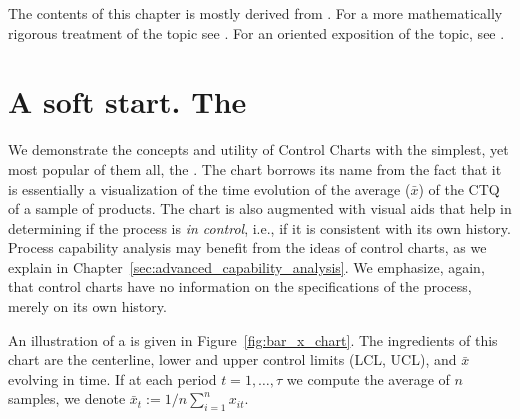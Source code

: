 \begin{extra}
The contents of this chapter is mostly derived from \cite{montgomery_introduction_2007}. 
For a more mathematically rigorous treatment of the topic see \cite{basseville_detection_1993}.
For an \R oriented exposition of the topic, see \cite{qiu_introduction_2013}.
\end{extra}

\section{A soft start. The \barxChart}




We demonstrate the concepts and utility of Control Charts with the simplest, yet most popular of them all, the \barxChart. 
The chart borrows its name from the fact that it is essentially a visualization of the time evolution of the average ($\bar{x}$) of the CTQ of a sample of products. 
The chart is also augmented with visual aids that help in determining if the process is \emph{in control}, i.e., if it is consistent with its own history. 
Process capability analysis may benefit from the ideas of control charts, as we explain in Chapter~\ref{sec:advanced_capability_analysis}.
We emphasize, again, that control charts have no information on the specifications of the process, merely on its own history.

An illustration of a \barxChart is given in Figure~\ref{fig:bar_x_chart}. 
The ingredients of this chart are the centerline, lower and upper control limits (LCL, UCL), and $\bar{x}$ evolving in time. 
If at each period $t=1,\dots,\tau$ we compute the average of $n$ samples, we denote $\bar{x}_t:=1/n \sum_{i=1}^n x_{it}$.

